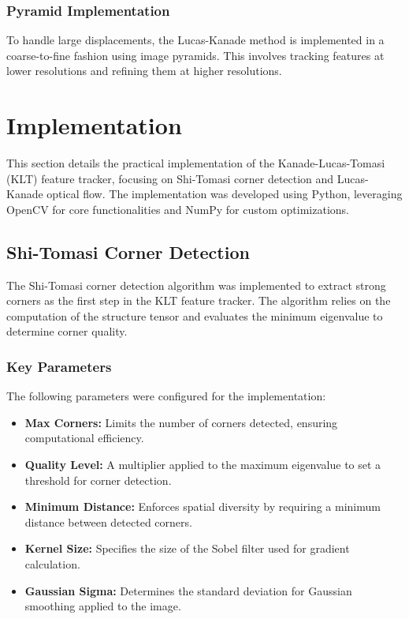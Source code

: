 \documentclass[11pt, conference, letterpaper]{IEEEtran}
\begin{document}
\subsubsection{Pyramid Implementation}
To handle large displacements, the Lucas-Kanade method is implemented in a coarse-to-fine fashion using image pyramids. This involves tracking features at lower resolutions and refining them at higher resolutions.


\section{Implementation}
This section details the practical implementation of the Kanade-Lucas-Tomasi (KLT) feature tracker, focusing on Shi-Tomasi corner detection and Lucas-Kanade optical flow. The implementation was developed using Python, leveraging OpenCV for core functionalities and NumPy for custom optimizations.

\subsection{Shi-Tomasi Corner Detection}
The Shi-Tomasi corner detection algorithm was implemented to extract strong corners as the first step in the KLT feature tracker. The algorithm relies on the computation of the structure tensor and evaluates the minimum eigenvalue to determine corner quality.

\subsubsection{Key Parameters}
The following parameters were configured for the implementation:
\begin{itemize}
    \item \textbf{Max Corners:} Limits the number of corners detected, ensuring computational efficiency.
    \item \textbf{Quality Level:} A multiplier applied to the maximum eigenvalue to set a threshold for corner detection.
    \item \textbf{Minimum Distance:} Enforces spatial diversity by requiring a minimum distance between detected corners.
    \item \textbf{Kernel Size:} Specifies the size of the Sobel filter used for gradient calculation.
    \item \textbf{Gaussian Sigma:} Determines the standard deviation for Gaussian smoothing applied to the image.
\end{itemize}
\bigskip
\end{document}
